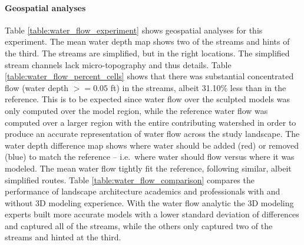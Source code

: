 \documentclass[prodmode,acmtochi]{acmsmall} %
\begin{document}
\paragraph{Geospatial analyses}
Table \ref{table:water_flow_experiment} 
shows geospatial analyses for this experiment.
The mean water depth map shows two of the streams 
and hints of the third.
The streams are simplified, but in the right locations. 
The simplified stream channels lack micro-topography
and thus details. 
Table \ref{table:water_flow_percent_cells} shows that 
there was substantial concentrated flow (water depth $>=0.05$ ft) 
in the streams, albeit 31.10\% less than in the reference.
This is to be expected since 
water flow over the sculpted models 
was only computed over the model region, while 
the reference water flow 
was computed over a larger region 
with the entire contributing watershed 
in order to produce an accurate representation 
of water flow across the study landscape. 
The water depth difference map shows
where water should be added (red) or removed (blue) 
to match the reference
-- i.e.~where water should flow versus where it was modeled. 
The mean water flow tightly fit the reference, 
following similar, albeit simplified routes.
Table \ref{table:water_flow_comparison} compares the performance of 
landscape architecture academics and professionals 
with and without 3D modeling experience. 
With the water flow analytic
the 3D modeling experts built more accurate models
with a lower standard deviation of differences 
and captured all of the streams,
while the others only captured two of the streams
and hinted at the third.
\end{document}
